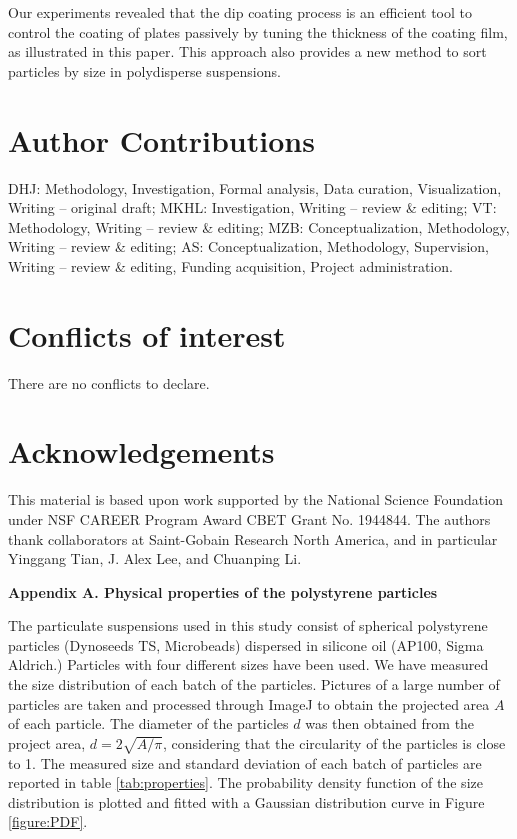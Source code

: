\documentclass{jfm}
\begin{document}
Our experiments revealed that the dip coating process is an efficient tool to control the coating of plates passively by tuning the thickness of the coating film, as illustrated in this paper. This approach also provides a new method to sort particles by size in polydisperse suspensions.

\section*{Author Contributions}
DHJ: Methodology, Investigation, Formal analysis, Data curation, Visualization, Writing – original draft; MKHL: Investigation, Writing – review \& editing; VT: Methodology, Writing – review \& editing; MZB: Conceptualization, Methodology, Writing – review \& editing; AS: Conceptualization, Methodology, Supervision, Writing – review \& editing, Funding acquisition, Project administration.

\section*{Conflicts of interest}
There are no conflicts to declare.

\section*{Acknowledgements}
This material is based upon work supported by the National Science Foundation under NSF CAREER Program Award CBET Grant No. 1944844. The authors thank collaborators at Saint-Gobain Research North America, and in particular Yinggang Tian, J. Alex Lee, and Chuanping Li.

\bigskip


\appendix

\noindent \textbf{Appendix A. Physical properties of the polystyrene particles}

\smallskip


\noindent The particulate suspensions used in this study consist of spherical polystyrene particles (Dynoseeds TS, Microbeads) dispersed in silicone oil (AP100, Sigma Aldrich.) Particles with four different sizes have been used. We have measured the size distribution of each batch of the particles. Pictures of a large number of particles are taken and processed through ImageJ to obtain the projected area $A$ of each particle. The diameter of the particles $d$ was then obtained from the project area, $d=2\sqrt{A/\pi}$, considering that the circularity of the particles is close to 1. The measured size and standard deviation of each batch of particles are reported in table \ref{tab:properties}. The probability density function of the size distribution is plotted and fitted with a Gaussian distribution curve in Figure \ref{figure:PDF}.
\end{document}
